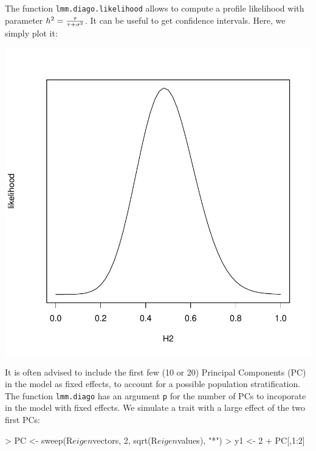 \documentclass{article}
\renewenvironment{Schunk}{\vspace{\topsep}}{\vspace{\topsep}}
\begin{document}
  The function \verb!lmm.diago.likelihood! allows to compute a profile likelihood with parameter 
  $h^2 = {\tau \over \tau + \sigma^2}$. It can be useful to get confidence intervals. Here,
  we simply plot it:

\begin{center}
\begin{Schunk}
\end{Schunk}
\includegraphics{gaston-051}
\end{center}

  It is often advised to include the first few (10 or 20) Principal Components (PC) in the model as fixed effects,
  to account for a possible population stratification. The function \verb!lmm.diago! has an argument \verb!p!
  for the number of PCs to incoporate in the model with fixed effects. We simulate a trait with a large effect of
  the two first PCs:
\begin{Schunk}
\begin{Sinput}
> PC <- sweep(R$eigen$vectors, 2, sqrt(R$eigen$values), "*")
> y1 <- 2 + PC[,1:2] %
\end{Sinput}
\end{Schunk}
\end{document}
